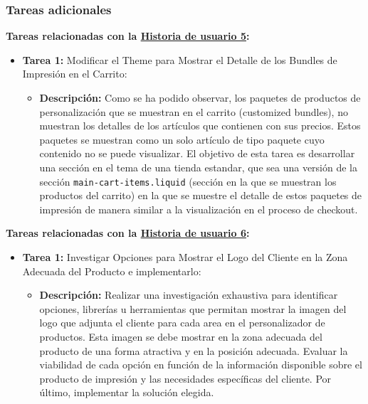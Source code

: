 \documentclass[12pt]{article}
\begin{document}
\subsubsection{Tareas adicionales}

\textbf{Tareas relacionadas con la \hyperref[sec:historia5]{Historia de usuario 5}:}
\begin{itemize}
    \item \textbf{Tarea 1:} Modificar el Theme para Mostrar el Detalle de los Bundles de Impresión en el Carrito:
          \begin{itemize}[label=--]
              \item \textbf{Descripción:} Como se ha podido observar, los paquetes de productos de personalización que se muestran en el carrito (customized bundles), no muestran los detalles de los artículos que contienen con sus precios. Estos paquetes se muestran como un solo artículo de tipo paquete cuyo contenido no se puede visualizar. El objetivo de esta tarea es desarrollar una sección en el tema de una tienda estandar, que sea una versión de la sección \texttt{main-cart-items.liquid} (sección en la que se muestran los productos del carrito) en la que se muestre el detalle de estos paquetes de impresión de manera similar a la visualización en el proceso de checkout.
          \end{itemize}
\end{itemize}


\textbf{Tareas relacionadas con la \hyperref[sec:historia6]{Historia de usuario 6}:}
\begin{itemize}
    \item \textbf{Tarea 1:} Investigar Opciones para Mostrar el Logo del Cliente en la Zona Adecuada del Producto e implementarlo:
          \begin{itemize}[label=--]
              \item \textbf{Descripción:} Realizar una investigación exhaustiva para identificar opciones, librerías u herramientas que permitan mostrar la imagen del logo que adjunta el cliente para cada area en el personalizador de productos. Esta imagen se debe mostrar en la zona adecuada del producto de una forma atractiva y en la posición adecuada. Evaluar la viabilidad de cada opción en función de la información disponible sobre el producto de impresión y las necesidades específicas del cliente. Por último, implementar la solución elegida.
          \end{itemize}
\end{itemize}
\end{document}
